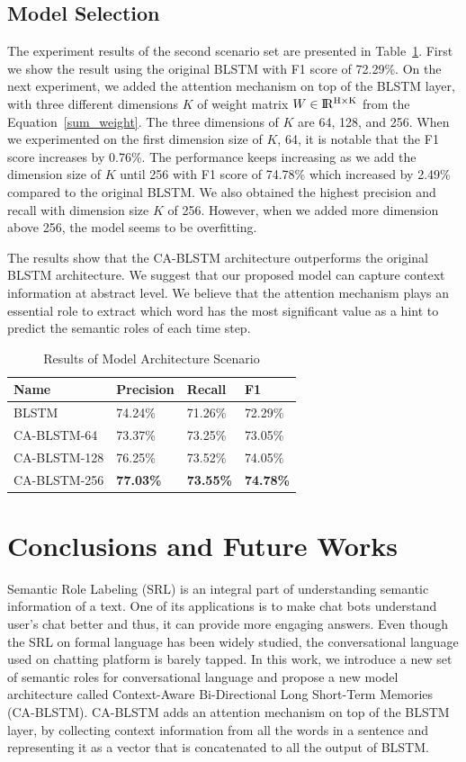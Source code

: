 \subsection{Model Selection}
The experiment results of the second scenario set are presented in Table~\ref{tab:architecture_scenario}. First we show the result using the original BLSTM with F1 score of 72.29\%. On the next experiment, we added the attention mechanism on top of the BLSTM layer, with three different dimensions $K$ of weight matrix $W \in {\rm I\!R^{H \times K}}$ from the Equation~\ref{sum_weight}. The three dimensions of $K$ are 64, 128, and 256. When we experimented on the first dimension size of $K$, 64, it is notable that the F1 score increases by 0.76\%. The performance keeps increasing as we add the dimension size of $K$ until 256 with F1 score of 74.78\% which increased by 2.49\% compared to the original BLSTM. We also obtained the highest precision and recall with dimension size $K$ of 256. However, when we added more dimension above 256, the model seems to be overfitting.

The results show that the CA-BLSTM architecture outperforms the original BLSTM architecture. We suggest that our proposed model can capture context information at abstract level. We believe that the attention mechanism plays an essential role to extract which word has the most significant value as a hint to predict the semantic roles of each time step.

\begin{table}
	\caption{Results of Model Architecture Scenario}
	\label{tab:architecture_scenario}
	\begin{tabular}{llll}
		\toprule
		Name			&Precision					&Recall		&F1			\\
		\midrule
		BLSTM				&	74.24\%				&	71.26\%				&	72.29\%	\\
		CA-BLSTM-64			&	73.37\%				&	73.25\%				&	73.05\%	\\
		CA-BLSTM-128		&	76.25\%				&	73.52\%				&	74.05\%	\\
		CA-BLSTM-256		&	\textbf{77.03\%}	&	\textbf{73.55\%}	&	\textbf{74.78\%}\\
		\bottomrule
	\end{tabular}
\end{table}


\section{Conclusions and Future Works}
Semantic Role Labeling (SRL) is an integral part of understanding semantic information of a text. One of its applications is to make chat bots understand user's chat better and thus, it can provide more engaging answers. Even though the SRL on formal language has been widely studied, the conversational language used on chatting platform is barely tapped. In this work, we introduce a new set of semantic roles for conversational language and propose a new model architecture called Context-Aware Bi-Directional Long Short-Term Memories (CA-BLSTM). CA-BLSTM adds an attention mechanism on top of the BLSTM layer, by collecting context information from all the words in a sentence and representing it as a vector that is concatenated to all the output of BLSTM.

